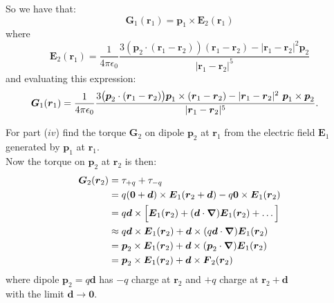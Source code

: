 \begin{enumerate}
    So we have that:
    $$\boldsymbol{G}_1(\boldsymbol{r}_1)
    =\boldsymbol{p}_1\times
    \boldsymbol{E}_2(\boldsymbol{r}_1)$$
    where
    $$\boldsymbol{E}_2(\boldsymbol{r}_1)=\frac{1}{4\pi\epsilon_0}
    \frac{3(\boldsymbol{p}_2\cdot(\boldsymbol{r}_1
    -\boldsymbol{r}_2))(\boldsymbol{r}_1-\boldsymbol{r}_2)
    -|\boldsymbol{r}_1-\boldsymbol{r}_2|^2\boldsymbol{p}_2}
    {|\boldsymbol{r}_1-\boldsymbol{r}_2|^5}$$
    and evaluating this expression:
    \begin{align*}
        \boldsymbol{G}_1(\boldsymbol{r}_1)
        &=\frac{1}{4\pi\epsilon_0}
        \frac{3\bigl(\boldsymbol{p}_2
        \cdot(\boldsymbol{r}_1-\boldsymbol{r}_2)\bigr)
        \boldsymbol{p}_1\times
        (\boldsymbol{r}_1-\boldsymbol{r}_2)
        -|\boldsymbol{r}_1-\boldsymbol{r}_2|^2
        \hspace{0.05in}\boldsymbol{p}_1\times\boldsymbol{p}_2}
        {|\boldsymbol{r}_1-\boldsymbol{r}_2|^5}.
    \end{align*}

    \newpage

    For part ($iv$) find the torque $\boldsymbol{G}_2$
    on dipole $\boldsymbol{p}_2$ at $\boldsymbol{r}_1$
    from the electric field $\boldsymbol{E}_1$
    generated by $\boldsymbol{p}_1$ at $\boldsymbol{r}_1$. \\
    
    Now the torque on $\boldsymbol{p}_2$ at $\boldsymbol{r}_2$ is then:
    \begin{align*}
        \boldsymbol{G}_2(\boldsymbol{r}_2)
        &=\tau_{+q}+\tau_{-q} \\
        &=q(\boldsymbol{0}+\boldsymbol{d})\times
        \boldsymbol{E}_1(\boldsymbol{r}_2+\boldsymbol{d})
        -q\boldsymbol{0}\times\boldsymbol{E}_1(\boldsymbol{r}_2) \\
        &=q\boldsymbol{d}\times
        \Bigl[\boldsymbol{E}_1(\boldsymbol{r}_2)
        +(\boldsymbol{d}\cdot\boldsymbol{\nabla})
        \boldsymbol{E}_1(\boldsymbol{r}_2)
        +\dots\Bigr] \\
        &\approx q\boldsymbol{d}\times\boldsymbol{E}_1(\boldsymbol{r}_2)
        +\boldsymbol{d}\times(q\boldsymbol{d}\cdot\boldsymbol{\nabla})
        \boldsymbol{E}_1(\boldsymbol{r}_2) \\
        &=\boldsymbol{p}_2\times\boldsymbol{E}_1(\boldsymbol{r}_2)
        +\boldsymbol{d}\times(\boldsymbol{p}_2\cdot\boldsymbol{\nabla})
        \boldsymbol{E}_1(\boldsymbol{r}_2) \\
        &=\boldsymbol{p}_2\times\boldsymbol{E}_1(\boldsymbol{r}_2)
        +\boldsymbol{d}\times\boldsymbol{F}_2(\boldsymbol{r}_2)
    \end{align*}
    where dipole $\boldsymbol{p}_2=q\boldsymbol{d}$ has $-q$ charge at $\boldsymbol{r}_2$
    and $+q$ charge at $\boldsymbol{r}_2+\boldsymbol{d}$ \\
    with the limit $\boldsymbol{d}\rightarrow\boldsymbol{0}$.


\end{enumerate}
